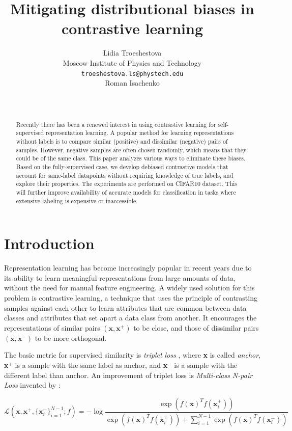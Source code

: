 \documentclass{article}
\title{Mitigating distributional biases in contrastive learning}
\author{ Lidia Troeshestova \\
	Moscow Institute of Physics and Technology\\
	\texttt{troeshestova.ls@phystech.edu} \\
	\And
	Roman Isachenko\\
	   \\
	\texttt{} \\
}
\date{}
\begin{document}
\nocite{*}
\maketitle

\begin{abstract}
	Recently there has been a renewed interest in using contrastive learning for self-supervised representation learning. A popular method for learning representations without labels is to compare similar (positive) and dissimilar (negative) pairs of samples. However, negative samples are often chosen randomly, which means that they could be of the same class. This paper analyzes various ways to eliminate these biases. Based on the fully-supervised case, we develop debiased contrastive models that account for same-label datapoints without requiring knowledge of true labels, and explore their properties. The experiments are performed on CIFAR10 dataset. This will further improve availability of accurate models for classification in tasks where extensive labeling is expensive or inaccessible.
\end{abstract}



\section{Introduction}
Representation learning has become increasingly popular in recent years due to its ability to learn meaningful representations from large amounts of data, without the need for manual feature engineering. A widely used solution for this problem is contrastive learning, a technique that uses the principle of contrasting samples against each other to learn attributes that are common between data classes and attributes that set apart a data class from another. It encourages the representations of similar pairs $(\textbf{x}, \textbf{x}^+)$ to be close, and those of dissimilar pairs $(\textbf{x}, \textbf{x}^-)$ to be more orthogonal.

The basic metric for supervised similarity is \textit{triplet loss} \citep{schroff2015facenet}, where \textbf{x} is called \textit{anchor}, \textbf{x}$^+$ is a sample with the same label as anchor, and \textbf{x}$^-$ is a sample with the different label than anchor. An improvement of triplet loss is \textit{Multi-class N-pair Loss} invented by \citep{NIPS2016_6b180037}:

\begin{equation} \label{eq:1}
\mathcal{L}(\textbf{x}, \textbf{x}^+, \{\textbf{x}_i^-\}_{i=1}^{N-1}; f) = - \log \frac{\exp(f(\textbf{x})^T f(\textbf{x}_i^+))}{\exp(f(\textbf{x})^T f(\textbf{x}_i^+)) + \sum _{i=1}^{N-1} \exp(f(\textbf{x})^Tf(\textbf{x}_i^-))}
\end{equation}
\end{document}
